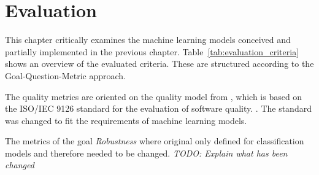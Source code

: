 \chapter{Evaluation}
This chapter critically examines the machine learning models conceived and partially implemented
in the previous chapter.
Table~\ref*{tab:evaluation_criteria} shows an overview of the evaluated criteria. These are
structured according to the Goal-Question-Metric approach.

The quality metrics are oriented on the quality model from
\cite[]{siebert_constructionqualitymodel_}, which is based on the ISO/IEC 9126 standard for the
evaluation of software quality. \cite[]{iso9126_softwareproductqualitymodel_}. The standard was
changed to fit the requirements of machine learning models.

The metrics of the goal \textit{Robustness} where original only defined for classification models
and therefore needed to be changed.
\textit{TODO: Explain what has been changed}


